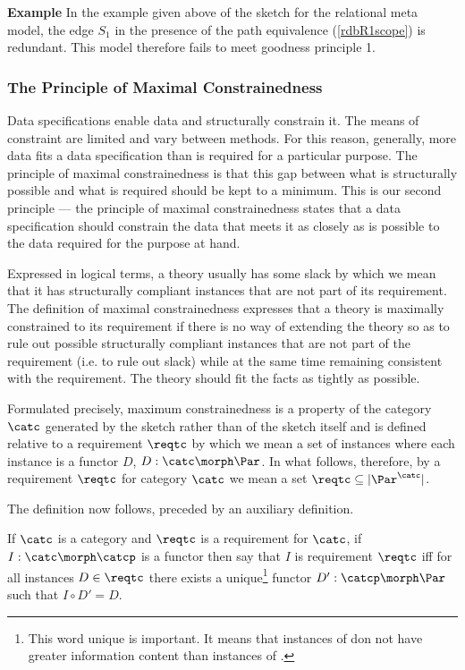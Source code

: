 \textbf{Example} In the example given above of the sketch for the relational meta model, 
the edge $S_1$ in the presence of the path equivalence (\ref{rdbR1scope}) is redundant. This model therefore fails to meet goodness principle 1.

\subsubsection{The Principle of Maximal Constrainedness}

Data specifications enable data and structurally constrain it. The means of constraint are limited and vary between methods. For this reason, generally, more data fits a data specification than is required for a particular purpose.  The principle of maximal constrainedness is that this gap between what is structurally possible and what is required should be kept to a minimum. This is our second principle 
--- the principle of maximal constrainedness states that a data specification should constrain the data that meets it as closely as is possible to the data required for the purpose at hand. 

Expressed in logical terms, a theory usually has some slack by which we mean that it has structurally compliant instances that are not part of its requirement.  The definition of maximal constrainedness expresses that a theory is maximally constrained to its requirement if there is no way of extending the theory so as to rule out possible structurally compliant instances that are not part of the requirement (i.e. to rule out slack) while at the same time remaining consistent with the requirement. The theory should fit the facts as tightly as possible.

Formulated precisely, maximum constrainedness  is a property of the category $\catc$ generated by the sketch  rather than of the sketch itself and is defined  relative to a requirement $\reqtc$ by which we mean a set of 
instances where each instance is a functor $D$, $D: \catc \morph \Par$. In what follows, therefore,  by a requirement $\reqtc$ for category $\catc$ we mean a set  $\reqtc \subseteq | \Par^{\catc} |$. 

The definition now follows, preceded by an auxiliary definition.
\begin{definition}
If $\catc$ is a category and $\reqtc$ is a requirement for $\catc$,  if $I: \catc \morph \catcp$ is a functor then say that $I$ is  requirement $\reqtc$ iff for all instances $D \in \reqtc$ 
there exists a unique\footnote{This word unique is important. It means that 
instances of \catcpw don not have greater information content than
instances of \catcw.}
 functor $D':\catcp \morph \Par$ such that $I \circ D'=D$.

\end{definition}

